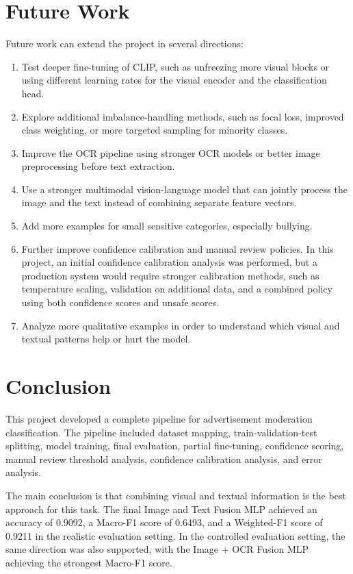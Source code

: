 \documentclass[12pt]{article}
\begin{document}
\section{Future Work}

Future work can extend the project in several directions:
\begin{enumerate}
    \item Test deeper fine-tuning of CLIP, such as unfreezing more visual blocks or using different learning rates for the visual encoder and the classification head.
    \item Explore additional imbalance-handling methods, such as focal loss, improved class weighting, or more targeted sampling for minority classes.
    \item Improve the OCR pipeline using stronger OCR models or better image preprocessing before text extraction.
    \item Use a stronger multimodal vision-language model that can jointly process the image and the text instead of combining separate feature vectors.
    \item Add more examples for small sensitive categories, especially bullying.
    \item Further improve confidence calibration and manual review policies. In this project, an initial confidence calibration analysis was performed, but a production system would require stronger calibration methods, such as temperature scaling, validation on additional data, and a combined policy using both confidence scores and unsafe scores.
    \item Analyze more qualitative examples in order to understand which visual and textual patterns help or hurt the model.
\end{enumerate}

\section{Conclusion}

This project developed a complete pipeline for advertisement moderation classification. The pipeline included dataset mapping, train-validation-test splitting, model training, final evaluation, partial fine-tuning, confidence scoring, manual review threshold analysis, confidence calibration analysis, and error analysis.

The main conclusion is that combining visual and textual information is the best approach for this task. The final Image and Text Fusion MLP achieved an accuracy of 0.9092, a Macro-F1 score of 0.6493, and a Weighted-F1 score of 0.9211 in the realistic evaluation setting. In the controlled evaluation setting, the same direction was also supported, with the Image + OCR Fusion MLP achieving the strongest Macro-F1 score.
\end{document}
